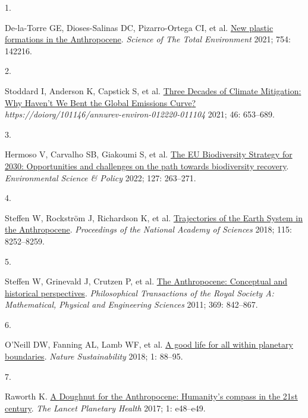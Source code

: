 \documentclass[
  11pt,
  a4paperpaper,
  onecolumn]{article}
\newlength{\cslhangindent}
\newlength{\csllabelwidth}
\newlength{\cslentryspacingunit} %
\newenvironment{CSLReferences}[2] %
 {%
  \setlength{\parindent}{0pt}
  \ifodd #1
  \let\oldpar\par
  \def\par{\hangindent=\cslhangindent\oldpar}
  \fi
  \setlength{\parskip}{#2\cslentryspacingunit}
 }%
 {}
\newcommand{\CSLLeftMargin}[1]{\parbox[t]{\csllabelwidth}{#1}}
\newcommand{\CSLRightInline}[1]{\parbox[t]{\linewidth - \csllabelwidth}{#1}\break}
\begin{document}
\hypertarget{refs}{}
\begin{CSLReferences}{0}{0}
\leavevmode{}%
\CSLLeftMargin{1. }%
\CSLRightInline{De-la-Torre GE, Dioses-Salinas DC, Pizarro-Ortega CI, et
al. \href{https://doi.org/10.1016/j.scitotenv.2020.142216}{New plastic
formations in the {Anthropocene}}. \emph{Science of The Total
Environment} 2021; 754: 142216.}

\leavevmode{}%
\CSLLeftMargin{2. }%
\CSLRightInline{Stoddard I, Anderson K, Capstick S, et al.
\href{https://doi.org/10.1146/ANNUREV-ENVIRON-012220-011104}{Three
{Decades} of {Climate Mitigation}: {Why Haven}'t {We Bent} the {Global
Emissions Curve}?}
\emph{https://doiorg/101146/annurev-environ-012220-011104} 2021; 46:
653--689.}

\leavevmode{}%
\CSLLeftMargin{3. }%
\CSLRightInline{Hermoso V, Carvalho SB, Giakoumi S, et al.
\href{https://doi.org/10.1016/J.ENVSCI.2021.10.028}{The {EU Biodiversity
Strategy} for 2030: {Opportunities} and challenges on the path towards
biodiversity recovery}. \emph{Environmental Science \& Policy} 2022;
127: 263--271.}

\leavevmode{}%
\CSLLeftMargin{4. }%
\CSLRightInline{Steffen W, Rockström J, Richardson K, et al.
\href{https://doi.org/10.1073/pnas.1810141115}{Trajectories of the
{Earth System} in the {Anthropocene}}. \emph{Proceedings of the National
Academy of Sciences} 2018; 115: 8252--8259.}

\leavevmode{}%
\CSLLeftMargin{5. }%
\CSLRightInline{Steffen W, Grinevald J, Crutzen P, et al.
\href{https://doi.org/10.1098/rsta.2010.0327}{The {Anthropocene}:
Conceptual and historical perspectives}. \emph{Philosophical
Transactions of the Royal Society A: Mathematical, Physical and
Engineering Sciences} 2011; 369: 842--867.}

\leavevmode{}%
\CSLLeftMargin{6. }%
\CSLRightInline{O'Neill DW, Fanning AL, Lamb WF, et al.
\href{https://doi.org/10.1038/s41893-018-0021-4}{A good life for all
within planetary boundaries}. \emph{Nature Sustainability} 2018; 1:
88--95.}

\leavevmode{}%
\CSLLeftMargin{7. }%
\CSLRightInline{Raworth K.
\href{https://doi.org/10.1016/S2542-5196(17)30028-1}{A {Doughnut} for
the {Anthropocene}: Humanity's compass in the 21st century}. \emph{The
Lancet Planetary Health} 2017; 1: e48--e49.}


\end{CSLReferences}
\end{document}
